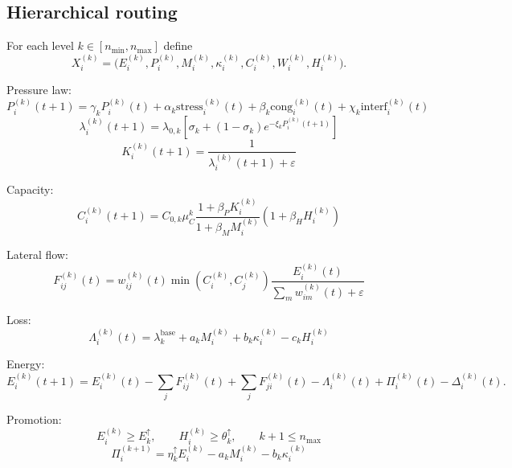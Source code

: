 \documentclass[11pt,a4paper]{article}
\begin{document}
\subsection{Hierarchical routing}

For each level $k\in[n_{\min},n_{\max}]$ define
\begin{equation}
X_i^{(k)}=
\bigl(
E_i^{(k)},P_i^{(k)},M_i^{(k)},\kappa_i^{(k)},C_i^{(k)},W_i^{(k)},H_i^{(k)}
\bigr).
\label{eq:route_obj}
\end{equation}

Pressure law:
\begin{equation}
P_i^{(k)}(t+1)=
\gamma_k P_i^{(k)}(t)
+\alpha_k \mathrm{stress}_i^{(k)}(t)
+\beta_k \mathrm{cong}_i^{(k)}(t)
+\chi_k \mathrm{interf}_i^{(k)}(t)
\label{eq:level_pressure}
\end{equation}
\begin{equation}
\lambda_i^{(k)}(t+1)=
\lambda_{0,k}\left[\sigma_k+(1-\sigma_k)e^{-\xi_k P_i^{(k)}(t+1)}\right]
\label{eq:level_lambda}
\end{equation}
\begin{equation}
K_i^{(k)}(t+1)=\frac{1}{\lambda_i^{(k)}(t+1)+\varepsilon}
\label{eq:level_compliance}
\end{equation}

Capacity:
\begin{equation}
C_i^{(k)}(t+1)=
C_{0,k}\mu_C^k
\frac{1+\beta_P K_i^{(k)}}{1+\beta_M M_i^{(k)}}
(1+\beta_H H_i^{(k)})
\label{eq:level_capacity}
\end{equation}

Lateral flow:
\begin{equation}
F_{ij}^{(k)}(t)=
w_{ij}^{(k)}(t)\min(C_i^{(k)},C_j^{(k)})
\frac{E_i^{(k)}(t)}{\sum_m w_{im}^{(k)}(t)+\varepsilon}
\label{eq:level_flow}
\end{equation}

Loss:
\begin{equation}
\Lambda_i^{(k)}(t)=
\lambda_k^{\mathrm{base}}+a_kM_i^{(k)}+b_k\kappa_i^{(k)}-c_kH_i^{(k)}
\label{eq:level_loss}
\end{equation}

Energy:
\begin{equation}
E_i^{(k)}(t+1)=
E_i^{(k)}(t)
-\sum_j F_{ij}^{(k)}(t)
+\sum_j F_{ji}^{(k)}(t)
-\Lambda_i^{(k)}(t)
+\Pi_i^{(k)}(t)
-\Delta_i^{(k)}(t).
\label{eq:level_energy}
\end{equation}

Promotion:
\begin{equation}
E_i^{(k)} \ge E_k^\uparrow,\qquad
H_i^{(k)}\ge \theta_k^\uparrow,\qquad
k+1\le n_{\max}
\label{eq:promotion_cond}
\end{equation}
\begin{equation}
\Pi_i^{(k+1)}=
\eta_k^\uparrow E_i^{(k)}-a_kM_i^{(k)}-b_k\kappa_i^{(k)}
\label{eq:promotion_energy}
\end{equation}
\end{document}
